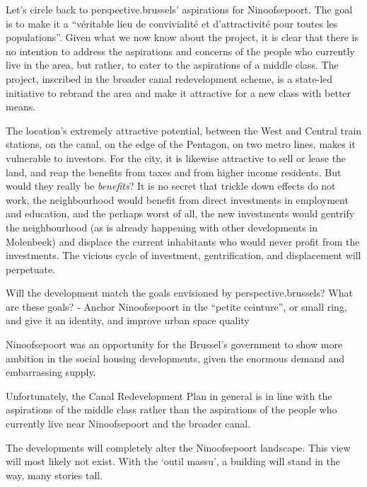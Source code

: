 \documentclass{article}[11pt]
\begin{document}
Let's circle back to perspective.brussels' aspirations for Ninoofsepoort. The goal is to make it a ``véritable lieu de convivialité et d’attractivité pour toutes les populations''. Given what we now know about the project, it is clear that there is no intention to address the aspirations and concerns of the people who currently live in the area, but rather, to cater to the aspirations of a middle class.
The project, inscribed in the broader canal redevelopment scheme, is a state-led initiative to rebrand the area and make it attractive for a new class with better means.

The location's extremely attractive potential, between the West and Central train stations, on the canal, on the edge of the Pentagon, on two metro lines, makes it vulnerable to investors. For the city, it is likewise attractive to sell or lease the land, and reap the benefits from taxes and from higher income residents. But would they really be \textit{benefits}? It is no secret that trickle down effects do not work, the neighbourhood would benefit from direct investments in employment and education, and the perhaps worst of all, the new investments would gentrify the neighbourhood (as is already happening with other developments in Molenbeek) and displace the current inhabitants who would never profit from the investments.
The vicious cycle of investment, gentrification, and displacement will perpetuate.

Will the development match the goals envisioned by perspective.brussels?
What are these goals?
	- Anchor Ninoofsepoort in the ``petite ceinture'', or small ring, and give it an identity, and improve urban space quality


Ninoofsepoort was an opportunity for the Brussel's government to show more ambition in the social housing developments, given the enormous demand and embarrassing supply. 

Unfortunately, the Canal Redevelopment Plan in general is in line with the aspirations of the middle class rather than the aspirations of the people who currently live near Ninoofsepoort and the broader canal.

The developments will completely alter the Ninoofsepoort landscape. This view will most likely not exist. With the `outil massu', a building will stand in the way, many stories tall.

\pagebreak

\printbibliography 
\end{document}
